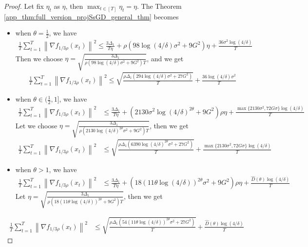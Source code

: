 \documentclass[10pt,a4paper]{amsart}
\def \nab {\nabla}
\def \sumT {\sum_{t=1}^T}
\newcommand{\norm}[2][]{\left\|#2\right\|^{#1}}
\begin{document}
\begin{proof}
    Let fix $\eta_t$ as $\eta$, then $\max_{t\in[T]}\eta_t=\eta$. The Theorem \ref{app_thm:full_version_projSsGD_general_thm} becomes

        \begin{itemize}
            \item when $\theta=\frac{1}{2}$, we have
            \begin{align}
                \frac{1}{T}\sumT \norm[2]{\nab f_{1/3\rho}(x_t)}\leq \frac{3\Delta_1}{T\eta}+\rho(98\log(4/\delta)\sigma^2+9G^2)\eta +\frac{36\sigma^2\log(4/\delta)}{T}
            \end{align}
            Then we choose $\eta=\sqrt{\frac{3\Delta_1}{\rho(98\log(4/\delta)\sigma^2+9G^2)T}}$, and we get
            \begin{align}
                \frac{1}{T}\sumT \norm[2]{\nab f_{1/3\rho}(x_t)}\leq\sqrt{\frac{\rho\Delta_1(294\log(4/\delta)\sigma^2+27G^2)}{T}}+\frac{36\log(4/\delta)\sigma^2}{T}
            \end{align}
            \item when $\theta\in(\frac{1}{2},1]$, we have
            \begin{align}
                \frac{1}{T}\sumT \norm[2]{\nab f_{1/3\rho}(x_t)} &\leq \frac{3\Delta_1}{T\eta}
                + (2130\sigma^2\log(4/\delta)^{2\theta}+9G^2)\rho\eta+ \frac{\max\{2130\sigma^2,72G\sigma\}\log(4/\delta)}{T}
            \end{align}
            Let we choose $\eta=\sqrt{\frac{3\Delta_1}{\rho(2130\log(4/\delta)^{2\theta}\sigma^2+9G^2)T}}$, then we get
            \begin{align}
                \frac{1}{T}\sumT \norm[2]{\nab f_{1/3\rho}(x_t)} &\leq \sqrt{\frac{\rho\Delta_1(6390\log(4/\delta)^{2\theta}\sigma^2+27G^2)}{T}}+\frac{\max\{2130\sigma^2,72G\sigma\}\log(4/\delta)}{T}
            \end{align}
            \item when $\theta>1$, we have
            \begin{align}
                \frac{1}{T}\sumT \norm[2]{\nab f_{1/3\rho}(x_t)}&\leq \frac{3\Delta_1}{T\eta}+(18(11\theta\log(4/\delta))^{2\theta}\sigma^2+9G^2)\rho\eta+\frac{\widehat{D}(\theta)\log(4/\delta)}{T}
            \end{align}
            Let $\eta = \sqrt{\frac{3\Delta_1}{\rho(18(11\theta\log(4/\delta))^{2\theta}+9G^2)T}}$, then we get
        \end{itemize}
        \begin{align}
            \frac{1}{T}\sumT \norm[2]{\nab f_{1/3\rho}(x_t)}&\leq \sqrt{\frac{\rho\Delta_1(54(11\theta\log(4/\delta))^{2\theta}\sigma^2+27G^2)}{T}}+\frac{\widehat{D}(\theta)\log(4/\delta)}{T}
        \end{align}
\end{proof}
\end{document}
